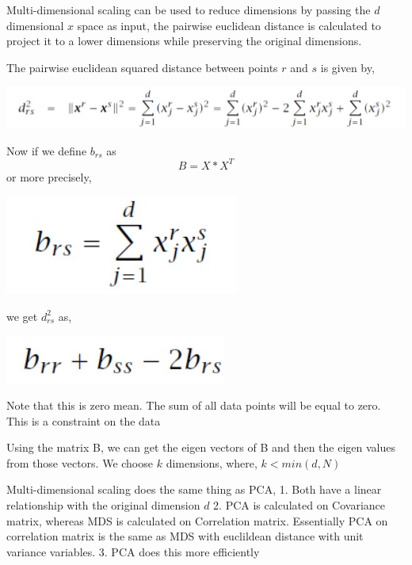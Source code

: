 \documentclass[11pt]{article}
\begin{document}
    Multi-dimensional scaling can be used to reduce dimensions by passing
the \(d\) dimensional \(x\) space as input, the pairwise euclidean
distance is calculated to project it to a lower dimensions while
preserving the original dimensions.

    The pairwise euclidean squared distance between points \(r\) and \(s\)
is given by, 
\mbox{}
\begin{center}
\includegraphics{image2.jpg}
\end{center}

    Now if we define \(b_{rs}\) as \[B = X*X^{T}\] or more precisely,
    \mbox{}
    \begin{center}
\includegraphics[scale = 0.6]{image.jpg}
\end{center}

    we get \(d^{2}_{rs}\) as,
    \mbox{}
    \begin{center}
    \includegraphics[scale = 0.6]{image1.jpg}
    \end{center}

    Note that this is zero mean. The sum of all data points will be equal to
zero. This is a constraint on the data

    Using the matrix B, we can get the eigen vectors of B and then the eigen
values from those vectors. We choose \(k\) dimensions, where,
\(k < min (d , N)\)

    Multi-dimensional scaling does the same thing as PCA, 1. Both have a
linear relationship with the original dimension \(d\) 2. PCA is
calculated on Covariance matrix, whereas MDS is calculated on
Correlation matrix. Essentially PCA on correlation matrix is the same as
MDS with euclildean distance with unit variance variables. 3. PCA does
this more efficiently
\end{document}
